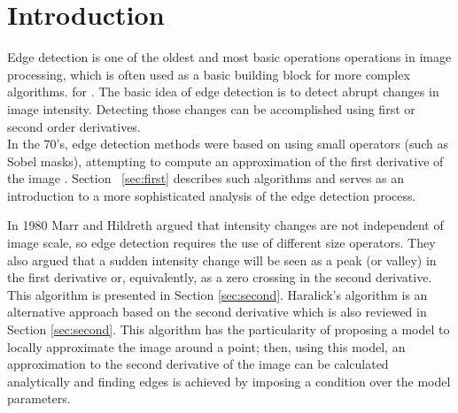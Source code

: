 \documentclass{ipol}
\numberwithin{equation}{section}
\numberwithin{table}{section}
\begin{document}




\section{Introduction}
\label{sec:intro}

Edge detection is one of the oldest and most basic operations operations in image processing, which is often used as a basic building block for more complex algorithms.  for 
. The basic idea of edge detection is to detect abrupt changes in image intensity. 
Detecting those changes can be accomplished using first or second order derivatives. \\

In the 70's, edge detection methods were based on using small operators 
(such as Sobel masks), attempting to compute an approximation of the
first derivative of the image \cite{Gonzalez2007Digital}. Section ~\ref{sec:first} describes such algorithms 
and serves as an introduction to a more sophisticated 
analysis of the edge detection process.

In 1980 Marr and Hildreth \cite{AIM-518} argued that intensity changes are not independent 
of image scale, so edge detection requires the use of different size 
operators. They also argued that a sudden intensity change will be seen 
as a peak (or valley) in the first derivative or, equivalently, as a zero 
crossing in the second derivative. This algorithm is presented in Section \ref{sec:second}. 
Haralick's algorithm \cite{bb20239} is an alternative approach based on the second derivative 
which is also reviewed in Section \ref{sec:second}. This algorithm has the particularity of 
proposing a model to locally approximate the image around a point; then, using this model, 
an approximation to the second derivative of the image can be calculated analytically and 
finding edges is achieved by imposing a condition over the model parameters. 
\end{document}

